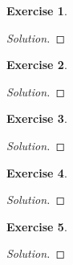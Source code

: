 \documentclass[12pt,a4]{article}
\theoremstyle{definition}
\newtheorem{exercise}{Exercise}
\begin{document}
\begin{exercise}
	 
\end{exercise}
\begin{proof}[Solution]
	
\end{proof}

\begin{exercise}
	
\end{exercise}
\begin{proof}[Solution]
	
\end{proof}

\begin{exercise}
	
\end{exercise}
\begin{proof}[Solution]
	
\end{proof}

\begin{exercise}
	
\end{exercise}
\begin{proof}[Solution]
	
\end{proof}

\begin{exercise}
	
\end{exercise}
\begin{proof}[Solution]
	
\end{proof}
\end{document}

